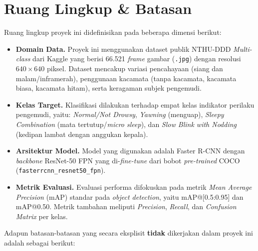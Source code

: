 \documentclass[11pt,a4paper,oneside]{report}
\begin{document}
\section{Ruang Lingkup \& Batasan}

Ruang lingkup proyek ini didefinisikan pada beberapa dimensi berikut:

\begin{itemize}[leftmargin=*]
    \item \textbf{Domain Data.} Proyek ini menggunakan dataset publik NTHU-DDD \textit{Multi-class} dari Kaggle yang berisi 66.521 \textit{frame} gambar (\texttt{.jpg}) dengan resolusi $640 \times 640$ piksel. Dataset mencakup variasi pencahayaan (siang dan malam/inframerah), penggunaan kacamata (tanpa kacamata, kacamata biasa, kacamata hitam), serta keragaman subjek pengemudi.
    \item \textbf{Kelas Target.} Klasifikasi dilakukan terhadap empat kelas indikator perilaku pengemudi, yaitu: \textit{Normal/Not Drowsy}, \textit{Yawning} (menguap), \textit{Sleepy Combination} (mata tertutup/\textit{micro sleep}), dan \textit{Slow Blink with Nodding} (kedipan lambat dengan anggukan kepala).
    \item \textbf{Arsitektur Model.} Model yang digunakan adalah Faster R-CNN dengan \textit{backbone} ResNet-50 FPN yang di-\textit{fine-tune} dari bobot \textit{pre-trained} COCO (\texttt{fasterrcnn\_resnet50\_fpn}).
    \item \textbf{Metrik Evaluasi.} Evaluasi performa difokuskan pada metrik \textit{Mean Average Precision} (mAP) standar pada \textit{object detection}, yaitu mAP@[0.5:0.95] dan mAP@0.50. Metrik tambahan meliputi \textit{Precision}, \textit{Recall}, dan \textit{Confusion Matrix} per kelas.
\end{itemize}

\noindent Adapun batasan-batasan yang secara eksplisit \textbf{tidak} dikerjakan dalam proyek ini adalah sebagai berikut:
\end{document}

